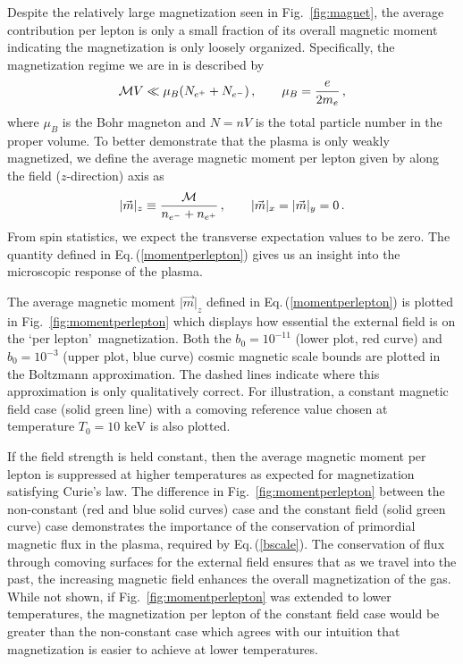 \documentclass[reprint]{revtex4-2}
\newcommand*{\keV}{\text{ keV}}
\newcommand{\req}[1]{Eq.\,(\ref{#1})}
\newcommand{\rf}[1]{Fig.~{\ref{#1}}}
\begin{document}
Despite the relatively large magnetization seen in \rf{fig:magnet}, the average contribution per lepton is only a small fraction of its overall magnetic moment indicating the magnetization is only loosely organized. Specifically, the magnetization regime we are in is described by
\begin{align}
    \label{fractionalmagnetization}
    {\cal M}V\ll\mu_{B}(N_{e^{+}}+N_{e^{-}})\,,\qquad\mu_{B}=\frac{e}{2m_{e}}\,,
\end{align}
where $\mu_{B}$ is the Bohr magneton and $N=nV$ is the total particle number in the proper volume. To better demonstrate that the plasma is only weakly magnetized, we define the average magnetic moment per lepton given by along the field ($z$-direction) axis as
\begin{align}
    \label{momentperlepton}
    \vert\vec{m}\vert_{z}\equiv\frac{{\cal M}}{n_{e^{-}}+n_{e^{+}}}\,,\qquad\vert\vec{m}\vert_{x}=\vert\vec{m}\vert_{y}=0\,.
\end{align}
From spin statistics, we expect the transverse expectation values to be zero. The quantity defined in \req{momentperlepton} gives us an insight into the microscopic response of the plasma.

The average magnetic moment $\vert\vec{m}\vert_{z}$ defined in \req{momentperlepton} is plotted in \rf{fig:momentperlepton} which displays how essential the external field is on the \lq per lepton\rq\ magnetization. Both the $b_{0}=10^{-11}$ (lower plot, red curve) and $b_{0}=10^{-3}$ (upper plot, blue curve) cosmic magnetic scale bounds are plotted in the Boltzmann approximation. The dashed lines indicate where this approximation is only qualitatively correct. For illustration, a constant magnetic field case (solid green line) with a comoving reference value chosen at temperature $T_{0}=10\keV$ is also plotted.

If the field strength is held constant, then the average magnetic moment per lepton is suppressed at higher temperatures as expected for magnetization satisfying Curie's law. The difference in \rf{fig:momentperlepton} between the non-constant (red and blue solid curves) case and the constant field (solid green curve) case demonstrates the importance of the conservation of primordial magnetic flux in the plasma, required by \req{bscale}. The conservation of flux through comoving surfaces for the external field ensures that as we travel into the past, the increasing magnetic field enhances the overall magnetization of the gas. While not shown, if \rf{fig:momentperlepton} was extended to lower temperatures, the magnetization per lepton of the constant field case would be greater than the non-constant case which agrees with our intuition that magnetization is easier to achieve at lower temperatures.
\end{document}
